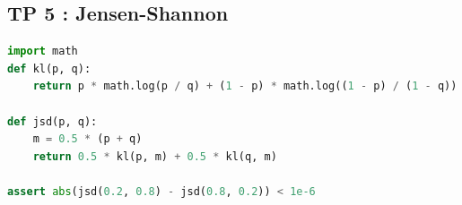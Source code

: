\documentclass[11pt,a4paper]{article}
\begin{document}
\subsection*{TP 5 : Jensen-Shannon}
\begin{lstlisting}[language=Python]
import math
def kl(p, q):
    return p * math.log(p / q) + (1 - p) * math.log((1 - p) / (1 - q))

def jsd(p, q):
    m = 0.5 * (p + q)
    return 0.5 * kl(p, m) + 0.5 * kl(q, m)

assert abs(jsd(0.2, 0.8) - jsd(0.8, 0.2)) < 1e-6
\end{lstlisting}
\end{document}
